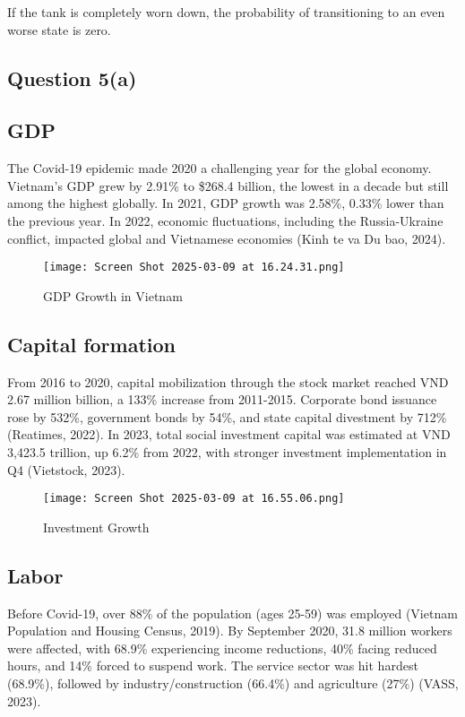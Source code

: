 \documentclass{article}
\begin{document}
If the tank is completely worn down, the probability of transitioning to an even worse state is zero.


\subsection*{Question 5(a)}

\subsection*{GDP}
The Covid-19 epidemic made 2020 a challenging year for the global economy. Vietnam's GDP grew by 2.91\% to \$268.4 billion, the lowest in a decade but still among the highest globally. In 2021, GDP growth was 2.58\%, 0.33\% lower than the previous year. In 2022, economic fluctuations, including the Russia-Ukraine conflict, impacted global and Vietnamese economies (Kinh te va Du bao, 2024).

\begin{figure}[H]
    \centering
    \texttt{[image: Screen Shot 2025-03-09 at 16.24.31.png]}
    \caption{GDP Growth in Vietnam}
    \label{fig:gdp}
\end{figure}

\FloatBarrier %

\subsection*{Capital formation}
From 2016 to 2020, capital mobilization through the stock market reached VND 2.67 million billion, a 133\% increase from 2011-2015. Corporate bond issuance rose by 532\%, government bonds by 54\%, and state capital divestment by 712\% (Reatimes, 2022). In 2023, total social investment capital was estimated at VND 3,423.5 trillion, up 6.2\% from 2022, with stronger investment implementation in Q4 (Vietstock, 2023).

\begin{figure}[H]
    \centering
    \texttt{[image: Screen Shot 2025-03-09 at 16.55.06.png]}
    \caption{Investment Growth}
    \label{fig:investment}
\end{figure}

\FloatBarrier %

\subsection*{Labor}
Before Covid-19, over 88\% of the population (ages 25-59) was employed (Vietnam Population and Housing Census, 2019). By September 2020, 31.8 million workers were affected, with 68.9\% experiencing income reductions, 40\% facing reduced hours, and 14\% forced to suspend work. The service sector was hit hardest (68.9\%), followed by industry/construction (66.4\%) and agriculture (27\%) (VASS, 2023).
\end{document}
